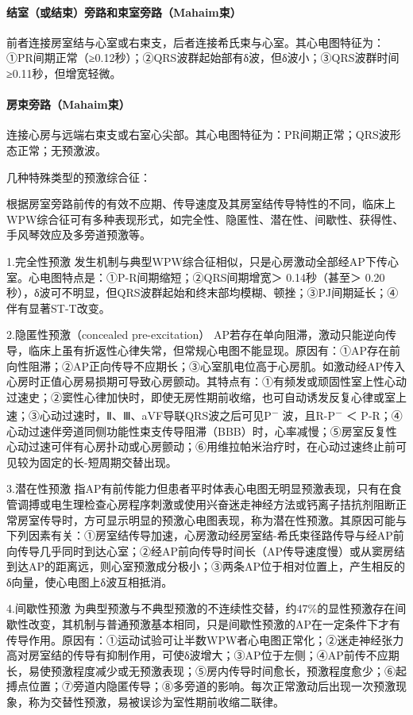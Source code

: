 \paragraph{结室（或结束）旁路和束室旁路（Mahaim束）}

前者连接房室结与心室或右束支，后者连接希氏束与心室。其心电图特征为：①PR间期正常（≥0.12秒）；②QRS波群起始部有δ波，但δ波小；③QRS波群时间≥0.11秒，但增宽轻微。

\paragraph{房束旁路（Mahaim束）}

连接心房与远端右束支或右室心尖部。其心电图特征为：PR间期正常；QRS波形态正常；无预激波。

几种特殊类型的预激综合征：

根据房室旁路前传的有效不应期、传导速度及其房室结传导特性的不同，临床上WPW综合征可有多种表现形式，如完全性、隐匿性、潜在性、间歇性、获得性、手风琴效应及多旁道预激等。

1.完全性预激
发生机制与典型WPW综合征相似，只是心房激动全部经AP下传心室。心电图特点是：①P-R间期缩短；②QRS间期增宽＞
0.14秒（甚至＞
0.20秒），δ波可不明显，但QRS波群起始和终末部均模糊、顿挫；③PJ间期延长；④伴有显著ST-T改变。

2.隐匿性预激（concealed pre-excitation）
AP若存在单向阻滞，激动只能逆向传导，临床上虽有折返性心律失常，但常规心电图不能显现。原因有：①AP存在前向性阻滞；②AP正向传导不应期长；③心室肌电位高于心房肌。如激动经AP传入心房时正值心房易损期可导致心房颤动。其特点有：①有频发或顽固性室上性心动过速史；②窦性心律加快时，即使无房性期前收缩，也可自动诱发反复心律或室上速；③心动过速时，Ⅱ、Ⅲ、aVF导联QRS波之后可见P\textsuperscript{−}
波，且R-P\textsuperscript{−} ＜
P-R；④心动过速伴旁道同侧功能性束支传导阻滞（BBB）时，心率减慢；⑤房室反复性心动过速可伴有心房扑动或心房颤动；⑥用维拉帕米治疗时，在心动过速终止前可见较为固定的长-短周期交替出现。

3.潜在性预激
指AP有前传能力但患者平时体表心电图无明显预激表现，只有在食管调搏或电生理检查心房程序刺激或使用兴奋迷走神经方法或钙离子拮抗剂阻断正常房室传导时，方可显示明显的预激心电图表现，称为潜在性预激。其原因可能与下列因素有关：①房室结传导加速，心房激动经房室结-希氏束径路传导与经AP前向传导几乎同时到达心室；②经AP前向传导时间长（AP传导速度慢）或从窦房结到达AP的距离远，则心室预激成分极小；③两条AP位于相对位置上，产生相反的δ向量，使心电图上δ波互相抵消。

4.间歇性预激
为典型预激与不典型预激的不连续性交替，约47\%的显性预激存在间歇性改变，其机制与普通预激基本相同，只是间歇性预激的AP在一定条件下才有传导作用。原因有：①运动试验可让半数WPW者心电图正常化；②迷走神经张力高对房室结的传导有抑制作用，可使δ波增大；③AP位于左侧；④AP前传不应期长，易使预激程度减少或无预激表现；⑤房内传导时间愈长，预激程度愈少；⑥起搏点位置；⑦旁道内隐匿传导；⑧多旁道的影响。每次正常激动后出现一次预激现象，称为交替性预激，易被误诊为室性期前收缩二联律。

